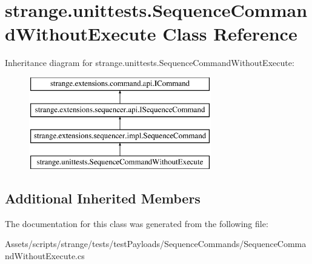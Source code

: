 \hypertarget{classstrange_1_1unittests_1_1_sequence_command_without_execute}{\section{strange.\-unittests.\-Sequence\-Command\-Without\-Execute Class Reference}
\label{classstrange_1_1unittests_1_1_sequence_command_without_execute}
}
Inheritance diagram for strange.\-unittests.\-Sequence\-Command\-Without\-Execute\-:\begin{figure}[H]
\begin{center}
\leavevmode
\includegraphics[height=4.000000cm]{classstrange_1_1unittests_1_1_sequence_command_without_execute}
\end{center}
\end{figure}
\subsection*{Additional Inherited Members}


The documentation for this class was generated from the following file\-:\begin{DoxyCompactItemize}
\item 
Assets/scripts/strange/tests/test\-Payloads/\-Sequence\-Commands/Sequence\-Command\-Without\-Execute.\-cs\end{DoxyCompactItemize}
